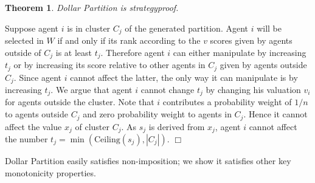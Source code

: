 \documentclass[letterpaper]{article}
\newtheorem{theorem}{Theorem}
\newcommand{\qed}{\unskip\hspace*{1em}\hspace{\fill}$\Box$}
\newenvironment{proof}[1][Proof]{\begin{trivlist}
 \item[\hskip \labelsep {\it #1:}]}{%
 \qed\end{trivlist}}
\begin{document}
\begin{theorem}
	Dollar Partition is strategyproof.
	\end{theorem}
	\begin{proof}
		Suppose agent $i$ is in cluster $C_j$ of the generated partition. Agent $i$ will be selected in $W$ if and only if its rank according to the $v$ scores given by agents outside of $C_j$ is at least $t_j$. Therefore agent $i$ can either manipulate by increasing $t_j$ or by increasing its score relative to other agents in $C_j$ given by agents outside $C_j$. Since agent $i$ cannot affect the latter, the only way it can manipulate is by increasing $t_j$. 
		We argue that agent $i$ cannot change $t_j$ by changing his valuation $v_i$ for agents outside the cluster. Note that $i$ contributes a probability weight of $1/n$ to agents outside $C_j$ and zero probability weight to agents in $C_j$. Hence it cannot affect the value $x_j$ of cluster $C_j$. As $s_j$ is derived from $x_j$, agent $i$ cannot affect the number $t_j= \min({\text{Ceiling}(s_j)},|C_j|)$.
	\end{proof}
	
	Dollar Partition easily satisfies non-imposition; we show it satisfies other 
	key monotonicity properties.
	
	
		
\end{document}
